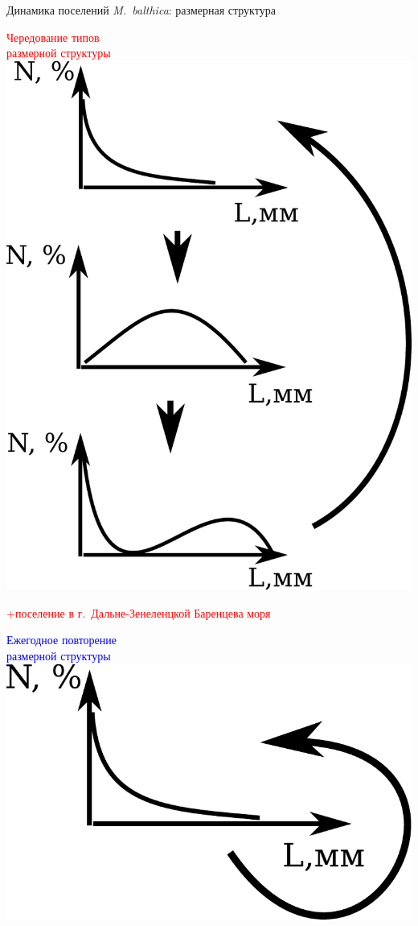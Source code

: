 \documentclass{beamer}
\begin{document}
\begin{frame}{Динамика поселений {\it M.~balthica}: размерная структура}
	\begin{minipage}[t]{.45\linewidth}
		\begin{center}
	\textcolor{red}{\footnotesize Чередование типов\\ размерной структуры}
			\includegraphics[width=.9\textwidth]{Dymanic_cheredovanie.pdf}
		\end{center}
\textcolor{red}{\scriptsize +поселение в г.~Дальне-Зенеленцкой Баренцева моря}
	\end{minipage}
%
	\begin{minipage}[t]{.53\linewidth}
		\begin{center}
	\textcolor{blue}{\footnotesize Ежегодное повторение\\ размерной структуры}\\
			\includegraphics[width=.6\textwidth]{Dymanic_povtorenie.pdf}\\


\end{center}
\end{minipage}
\end{frame}
\end{document}
